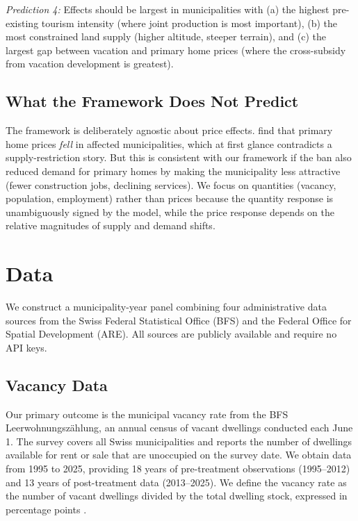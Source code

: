 \documentclass[12pt]{article}
\begin{document}
\textit{Prediction 4:} Effects should be largest in municipalities with (a) the highest pre-existing tourism intensity (where joint production is most important), (b) the most constrained land supply (higher altitude, steeper terrain), and (c) the largest gap between vacation and primary home prices (where the cross-subsidy from vacation development is greatest).

\subsection{What the Framework Does Not Predict}

The framework is deliberately agnostic about price effects. \citet{hilber2020economic} find that primary home prices \textit{fell} in affected municipalities, which at first glance contradicts a supply-restriction story. But this is consistent with our framework if the ban also reduced demand for primary homes by making the municipality less attractive (fewer construction jobs, declining services). We focus on quantities (vacancy, population, employment) rather than prices because the quantity response is unambiguously signed by the model, while the price response depends on the relative magnitudes of supply and demand shifts.


\section{Data}
\label{sec:data}

We construct a municipality-year panel combining four administrative data sources from the Swiss Federal Statistical Office (BFS) and the Federal Office for Spatial Development (ARE). All sources are publicly available and require no API keys.

\subsection{Vacancy Data}

Our primary outcome is the municipal vacancy rate from the BFS Leerwohnungsz\"{a}hlung, an annual census of vacant dwellings conducted each June 1. The survey covers all Swiss municipalities and reports the number of dwellings available for rent or sale that are unoccupied on the survey date. We obtain data from 1995 to 2025, providing 18 years of pre-treatment observations (1995--2012) and 13 years of post-treatment data (2013--2025). We define the vacancy rate as the number of vacant dwellings divided by the total dwelling stock, expressed in percentage points \citep{bfs2023leerwohnung}.
\end{document}
